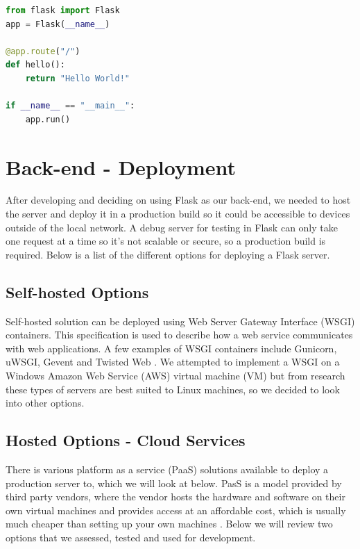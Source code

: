 \begin{lstlisting}[language=PYTHON]
from flask import Flask
app = Flask(__name__)

@app.route("/")
def hello():
    return "Hello World!"

if __name__ == "__main__":
    app.run()

\end{lstlisting}

\section{Back-end - Deployment}
After developing and deciding on using Flask as our back-end, we needed to host the server and deploy it in a production build so it could be accessible to devices outside of the local network. A debug server for testing in Flask can only take one request at a time so it's not scalable or secure, so a production build is required. Below is a list of the different options for deploying a Flask server.

\subsection{Self-hosted Options}
Self-hosted solution can be deployed using Web Server Gateway Interface (WSGI) containers. This specification is used to describe how a web service communicates with web applications. A few examples of WSGI containers include Gunicorn, uWSGI, Gevent and Twisted Web \cite{wsgi}. We attempted to implement a WSGI on a Windows Amazon Web Service (AWS) virtual machine (VM) but from research these types of servers are best suited to Linux machines, so we decided to look into other options.

\subsection{Hosted Options - Cloud Services}
There is various platform as a service (PaaS) solutions available to deploy a production server to, which we will look at below. PasS is a model provided by third party vendors, where the vendor hosts the hardware and software on their own virtual machines and provides access at an affordable cost, which is usually much cheaper than setting up your own machines \cite{heroku}. Below we will review two options that we assessed, tested and used for development.

